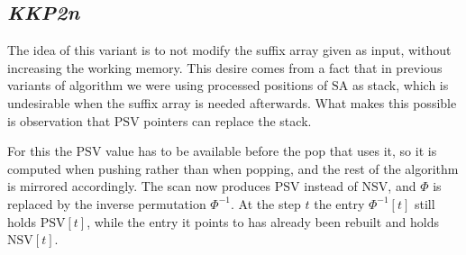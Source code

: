 \subsection{\emph{KKP2n}}
The idea of this variant is to not modify the suffix array given as input, without increasing the working memory. This desire comes from a fact that in previous variants of algorithm we were using processed positions of \(\mathrm{SA}\) as stack, which is undesirable when the suffix array is needed afterwards. What makes this possible is observation that \(\mathrm{PSV}\) pointers can replace the stack. 

For this the \(\mathrm{PSV}\) value has to be available before the pop that uses it, so it is computed when pushing rather than when popping, and the rest of the algorithm is mirrored accordingly. The scan now produces \(\mathrm{PSV}\) instead of \(\mathrm{NSV}\), and \(\Phi\) is replaced by the inverse permutation \(\Phi^{-1}\). At the step \(t\) the entry \(\Phi^{-1}[t]\) still holds \(\mathrm{PSV}[t]\), while the entry it points to has already been rebuilt and holds \(\mathrm{NSV}[t]\).

